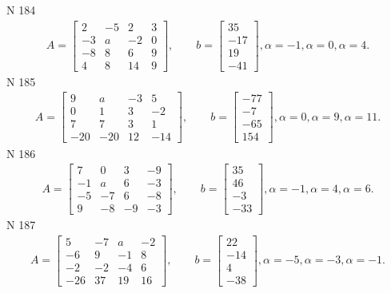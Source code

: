 \documentclass[11pt]{report}
\begin{document}
N 184
\begin{align*}
 A = \left[\begin{matrix}2 & -5 & 2 & 3\\-3 & a & -2 & 0\\-8 & 8 & 6 & 9\\4 & 8 & 14 & 9\end{matrix}\right],
    \qquad b = \left[\begin{matrix}35\\-17\\19\\-41\end{matrix}\right], \alpha = -1, \alpha = 0, \alpha = 4. 
 \end{align*}
N 185
\begin{align*}
 A = \left[\begin{matrix}9 & a & -3 & 5\\0 & 1 & 3 & -2\\7 & 7 & 3 & 1\\-20 & -20 & 12 & -14\end{matrix}\right],
    \qquad b = \left[\begin{matrix}-77\\-7\\-65\\154\end{matrix}\right], \alpha = 0, \alpha = 9, \alpha = 11. 
 \end{align*}
N 186
\begin{align*}
 A = \left[\begin{matrix}7 & 0 & 3 & -9\\-1 & a & 6 & -3\\-5 & -7 & 6 & -8\\9 & -8 & -9 & -3\end{matrix}\right],
    \qquad b = \left[\begin{matrix}35\\46\\-3\\-33\end{matrix}\right], \alpha = -1, \alpha = 4, \alpha = 6. 
 \end{align*}
N 187
\begin{align*}
 A = \left[\begin{matrix}5 & -7 & a & -2\\-6 & 9 & -1 & 8\\-2 & -2 & -4 & 6\\-26 & 37 & 19 & 16\end{matrix}\right],
    \qquad b = \left[\begin{matrix}22\\-14\\4\\-38\end{matrix}\right], \alpha = -5, \alpha = -3, \alpha = -1. 
 \end{align*}
\end{document}
